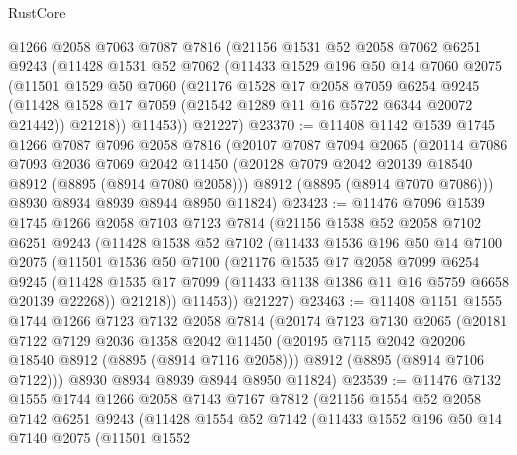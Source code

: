 \begin{lexlean}{RustCore}
\begin{coremodule}
    @1266
    @2058
    @7063
    @7087
    @7816
    (@21156
      @1531
      @52
      @2058
      @7062
      @6251
      @9243
      (@11428
        @1531
        @52
        @7062
        (@11433
          @1529
          @196
          @50
          @14
          @7060
          @2075
          (@11501
            @1529
            @50
            @7060
            (@21176
              @1528
              @17
              @2058
              @7059
              @6254
              @9245
              (@11428 @1528 @17 @7059 (@21542 @1289 @11 @16 @5722 @6344 @20072 @21442))
              @21218))
          @11453))
      @21227)
@23370 := @11408
    @1142
    @1539
    @1745
    @1266
    @7087
    @7096
    @2058
    @7816
    (@20107
      @7087
      @7094
      @2065
      (@20114
        @7086
        @7093
        @2036
        @7069
        @2042
        @11450
        (@20128 @7079 @2042 @20139 @18540 @8912 (@8895 (@8914 @7080 @2058)))
        @8912
        (@8895 (@8914 @7070 @7086)))
      @8930
      @8934
      @8939
      @8944
      @8950
      @11824)
@23423 := @11476
    @7096
    @1539
    @1745
    @1266
    @2058
    @7103
    @7123
    @7814
    (@21156
      @1538
      @52
      @2058
      @7102
      @6251
      @9243
      (@11428
        @1538
        @52
        @7102
        (@11433
          @1536
          @196
          @50
          @14
          @7100
          @2075
          (@11501
            @1536
            @50
            @7100
            (@21176
              @1535
              @17
              @2058
              @7099
              @6254
              @9245
              (@11428 @1535 @17 @7099 (@11433 @1138 @1386 @11 @16 @5759 @6658 @20139 @22268))
              @21218))
          @11453))
      @21227)
@23463 := @11408
    @1151
    @1555
    @1744
    @1266
    @7123
    @7132
    @2058
    @7814
    (@20174
      @7123
      @7130
      @2065
      (@20181
        @7122
        @7129
        @2036
        @1358
        @2042
        @11450
        (@20195 @7115 @2042 @20206 @18540 @8912 (@8895 (@8914 @7116 @2058)))
        @8912
        (@8895 (@8914 @7106 @7122)))
      @8930
      @8934
      @8939
      @8944
      @8950
      @11824)
@23539 := @11476
    @7132
    @1555
    @1744
    @1266
    @2058
    @7143
    @7167
    @7812
    (@21156
      @1554
      @52
      @2058
      @7142
      @6251
      @9243
      (@11428
        @1554
        @52
        @7142
        (@11433
          @1552
          @196
          @50
          @14
          @7140
          @2075
          (@11501
            @1552

\end{coremodule}
\end{lexlean}
